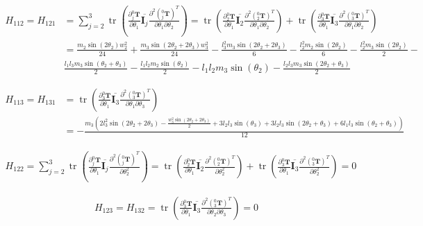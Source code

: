 \documentclass{homework}
\begin{document}
\begin{sol}
\begin{align*}
  H_{112} = H_{121} &= \sum_{j=2}^3 \operatorname{tr} (\frac{\partial {^0_j}\mathbf{T}}{\partial \theta_1} \overline{\mathbf{I}_j} \frac{\partial^2 ({^0_j}\mathbf{T})^T}{\partial \theta_1 \partial \theta_2}) 
                    = \operatorname{tr} (\frac{\partial {^0_2}\mathbf{T}}{\partial \theta_1} \overline{\mathbf{I}_2} \frac{\partial^2 ({^0_2}\mathbf{T})^T}{\partial \theta_1 \partial \theta_2}) + \operatorname{tr} (\frac{\partial {^0_3}\mathbf{T}}{\partial \theta_1} \overline{\mathbf{I}_3} \frac{\partial^2 ({^0_3}\mathbf{T})^T}{\partial \theta_1 \partial \theta_2}) \\
                    &= \frac{m_2 \sin(2\theta_2) w_2^2}{24} + \frac{m_3 \sin(2\theta_2 + 2\theta_3) w_3^2}{24} - \frac{l_3^2 m_3 \sin(2\theta_2 + 2\theta_3)}{6} - \frac{l_2^2 m_2 \sin(2\theta_2)}{6} - \frac{l_2^2 m_3 \sin(2\theta_2)}{2} - \\
                    & \frac{l_1 l_3 m_3 \sin(\theta_2 + \theta_3)}{2} - \frac{l_1 l_2 m_2 \sin(\theta_2)}{2} - l_1 l_2 m_3 \sin(\theta_2) - \frac{l_2 l_3 m_3 \sin(2\theta_2 + \theta_3)}{2} 
\end{align*}

\begin{align*}
  H_{113} = H_{131} &= \operatorname{tr} (\frac{\partial {^0_3}\mathbf{T}}{\partial \theta_1} \overline{\mathbf{I}_3} \frac{\partial^2 ({^0_3}\mathbf{T})^T}{\partial \theta_1 \partial \theta_3}) \\
                    &= -\frac{m_3 (2 l_3^2 \sin(2\theta_2 + 2\theta_3) - \frac{w_3^2 \sin(2\theta_2 + 2\theta_3)}{2} + 3 l_2 l_3 \sin(\theta_3) + 3 l_2 l_3 \sin(2\theta_2 + \theta_3) + 6 l_1 l_3 \sin(\theta_2 + \theta_3))}{12}
\end{align*}

\begin{align*}
  H_{122} = \sum_{j=2}^3 \operatorname{tr} (\frac{\partial {^0_j}\mathbf{T}}{\partial \theta_1} \overline{\mathbf{I}_j} \frac{\partial^2 ({^0_j}\mathbf{T})^T}{\partial \theta_2^2}) 
          = \operatorname{tr} (\frac{\partial {^0_2}\mathbf{T}}{\partial \theta_1} \overline{\mathbf{I}_2} \frac{\partial^2 ({^0_2}\mathbf{T})^T}{\partial \theta_2^2}) + \operatorname{tr} (\frac{\partial {^0_3}\mathbf{T}}{\partial \theta_1} \overline{\mathbf{I}_3} \frac{\partial^2 ({^0_3}\mathbf{T})^T}{\partial \theta_2^2})
          = 0
\end{align*}

\begin{align*}
  H_{123} = H_{132} = \operatorname{tr} (\frac{\partial {^0_3}\mathbf{T}}{\partial \theta_1} \overline{\mathbf{I}_3} \frac{\partial^2 ({^0_3}\mathbf{T})^T}{\partial \theta_2 \partial \theta_3}) 
                    = 0
\end{align*}


\end{sol}
\end{document}
